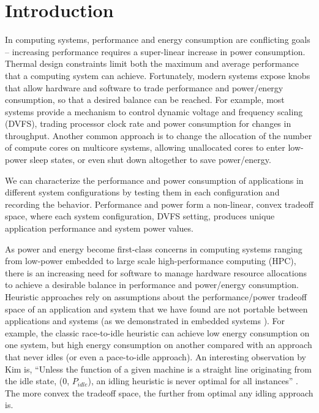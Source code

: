 \section{Introduction}

In computing systems, performance and energy consumption are conflicting goals -- increasing performance requires a super-linear increase in power consumption.
Thermal design constraints limit both the maximum and average performance that a computing system can achieve.
Fortunately, modern systems expose knobs that allow hardware and software to trade performance and power/energy consumption, so that a desired balance can be reached.
For example, most systems provide a mechanism to control dynamic voltage and frequency scaling (DVFS), trading processor clock rate and power consumption for changes in throughput.
Another common approach is to change the allocation of the number of compute cores on multicore systems, allowing unallocated cores to enter low-power sleep states, or even shut down altogether to save power/energy.

We can characterize the performance and power consumption of applications in different system configurations by testing them in each configuration and recording the behavior.
Performance and power form a non-linear, convex tradeoff space, where each system configuration, \eg DVFS setting, produces unique application performance and system power values.

As power and energy become first-class concerns in computing systems ranging from low-power embedded to large scale high-performance computing (HPC), there is an increasing need for software to manage hardware resource allocations to achieve a desirable balance in performance and power/energy consumption.
Heuristic approaches rely on assumptions about the performance/power tradeoff space of an application and system that we have found are not portable between applications and systems (as we demonstrated in embedded systems \cite{Imes2014}).
For example, the classic race-to-idle heuristic can achieve low energy consumption on one system, but high energy consumption on another compared with an approach that never idles (or even a pace-to-idle approach).
An interesting observation by Kim \etal is, ``Unless the function of a given machine is a straight line originating from the idle state, (0, $P_{idle}$), an idling heuristic is never optimal for all instances'' \cite{kim-cpsna2015}.
The more convex the tradeoff space, the further from optimal any idling approach is.

